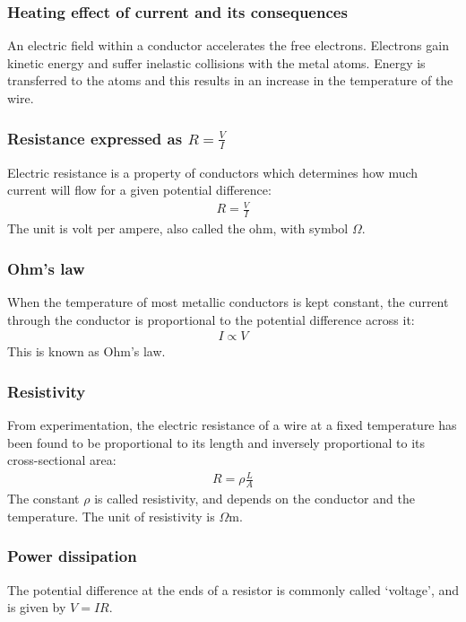 \subsubsection{Heating effect of current and its consequences}
An electric field within a conductor accelerates the free electrons. Electrons
gain kinetic energy and suffer inelastic collisions with the metal atoms. Energy
is transferred to the atoms and this results in an increase in the temperature
of the wire.

\subsubsection{Resistance expressed as $R = \frac{V}{I}$}
Electric resistance is a property of conductors which determines how much
current will flow for a given potential difference:
\begin{align*}
    R = \frac{V}{I}
\end{align*}
The unit is volt per ampere, also called the ohm, with symbol $\Omega$.

\subsubsection{Ohm's law}
When the temperature of most metallic conductors is kept constant, the current
through the conductor is proportional to the potential difference across it:
\begin{align*}
    I \propto V
\end{align*}
This is known as Ohm's law.

\subsubsection{Resistivity}
From experimentation, the electric resistance of a wire at a fixed temperature
has been found to be proportional to its length and inversely proportional to
its cross-sectional area:
\begin{align*}
    R = \rho \frac{L}{A}
\end{align*}
The constant $\rho$ is called resistivity, and depends on the conductor and the
temperature. The unit of resistivity is $\Omega$m.

\subsubsection{Power dissipation}
The potential difference at the ends of a resistor is commonly called
`voltage', and is given by $V = IR$.

